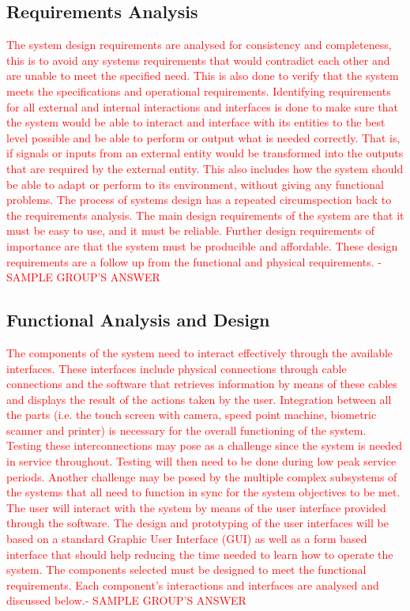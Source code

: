 \documentclass[a4paper,11pt,fleqn]{report}
\begin{document}
{\subsection{Requirements Analysis}
\textcolor{red}{The system design requirements are analysed for consistency and completeness, this is to avoid any systems requirements that would contradict each other and are unable to meet the specified need. This is also done to verify that the system meets the specifications and operational requirements. Identifying requirements for all external and internal interactions and interfaces is done to make sure that the system would be able to interact and interface with its entities to the best level possible and be able to perform or output what is needed correctly. That is, if signals or inputs from an external entity would be transformed into the outputs that are required by the external entity. This also includes how the system should be able to adapt or perform to its environment, without giving any functional problems.
The process of systems design has a repeated circumspection back to the requirements analysis. The main design requirements of the system are that it must be easy to use, and it must be reliable. Further design requirements of importance are that the system must be producible and affordable. These design requirements are a follow up from the functional and physical requirements. - SAMPLE GROUP'S ANSWER}

\subsection{Functional Analysis and Design}
\textcolor{red}{The components of the system need to interact effectively through the available interfaces. These interfaces include physical connections through cable connections and the software that retrieves information by means of these cables and displays the result of the actions taken by the user. Integration between all the parts (i.e. the touch screen with camera, speed point machine, biometric scanner and printer) is necessary for the overall functioning of the system. Testing these interconnections may pose as a challenge since the system is needed in service throughout. Testing will then need to be done during low peak service periods. Another challenge may be posed by the multiple complex subsystems of the systems that all need to function in sync for the system objectives to be met. The user will interact with the system by means of the user interface provided through the software. The design and prototyping of the user interfaces will be based on a standard Graphic User Interface (GUI) as well as a form based interface that should help reducing the time needed to learn how to operate the system.
The components selected must be designed to meet the functional requirements. Each component’s interactions and interfaces are analysed and discussed below.- SAMPLE GROUP'S ANSWER}

}
\end{document}

